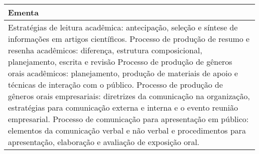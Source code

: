\begin{quadro}[ht!]
\begin{tabular}{|p{3cm} p{2cm} p{3cm} p{2cm} p{3cm} p{2cm}|}
\multicolumn{6}{|p{15cm}|}{\cellcolor{blue1} Ementa} \\\hline
\hline\multicolumn{6}{|p{15cm}|}{\scriptsize Estratégias de leitura acadêmica: antecipação, seleção e síntese de informações em artigos científicos. Processo de produção de resumo e resenha acadêmicos: diferença, estrutura composicional, planejamento, escrita e revisão Processo de produção de gêneros orais acadêmicos: planejamento, produção de materiais de apoio e técnicas de interação com o público. Processo de produção de gêneros orais empresariais: diretrizes da comunicação na organização, estratégias para comunicação externa e interna e o evento reunião empresarial. Processo de comunicação para apresentação em público: elementos da comunicação verbal e não verbal e procedimentos para apresentação, elaboração e avaliação de exposição oral.}\\\hline 
\hline
	\end{tabular}
\end{quadro}


